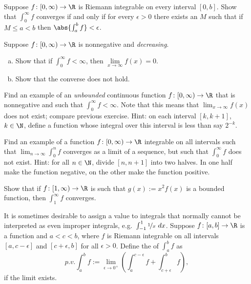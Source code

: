 \documentclass[12pt]{book}
\begin{document}
\begin{exercise}
Suppose $f \colon [0,\infty) \to \R$ is Riemann integrable on every interval
$[0,b]$.
Show that  $\int_0^\infty f$ converges if and only if
for every $\epsilon > 0$ there exists an $M$ such that if $M \leq a < b$
then $\abs{\int_a^b f} < \epsilon$.
\end{exercise}

\begin{exercise}
Suppose $f \colon [0,\infty) \to \R$ is nonnegative and
\emph{decreasing}.
\begin{enumerate}[a)]
 \item Show that if $\int_0^\infty f < \infty$, then $\lim\limits_{x\to\infty} f(x) = 0$.
  \item Show that the converse does not hold.
\end{enumerate}
\end{exercise}

\begin{exercise}
Find an example of an \emph{unbounded} continuous function $f \colon
[0,\infty) \to \R$ that is nonnegative and such that $\int_0^\infty f < \infty$.
Note that this means that $\lim_{x\to\infty} f(x)$ does not exist; compare
previous exercise.
Hint: on each interval $[k,k+1]$, $k \in \N$, define a function whose
integral over this interval is less than say $2^{-k}$.
\end{exercise}

\begin{exercise}
Find an example of a function $f \colon [0,\infty) \to \R$ integrable on all
intervals such that $\lim_{n\to\infty} \int_0^n f$ converges as a
limit of a sequence, but such that
$\int_0^\infty f$ does not exist.
Hint: for all $n\in \N$, divide $[n,n+1]$ into two halves.
In one half
make the function negative, on the other make the function positive.
\end{exercise}

\begin{exercise}
Show that if $f \colon [1,\infty) \to \R$ is such that
$g(x) := x^2 f(x)$ is a bounded function, then
$\int_1^\infty f$ converges.
\end{exercise}

\begin{exnote}
It is sometimes desirable to assign a value to integrals that normally
cannot be interpreted as even improper integrals,
e.g.\ $\int_{-1}^1 \nicefrac{1}{x}~dx$.
Suppose $f \colon [a,b] \to \R$ is a function and $a < c < b$,
where $f$ is Riemann integrable on all intervals
$[a,c-\epsilon]$ and $[c+\epsilon,b]$ for all $\epsilon > 0$.
Define
the \emph{} of $\int_a^b f$ as
\begin{equation*}
p.v.\!\int_a^b f := \lim_{\epsilon\to 0^+}
\left(
\int_a^{c-\epsilon} f + 
\int_{c+\epsilon}^b f
\right) ,
\end{equation*}
if the limit exists.
\end{exnote}
\end{document}
